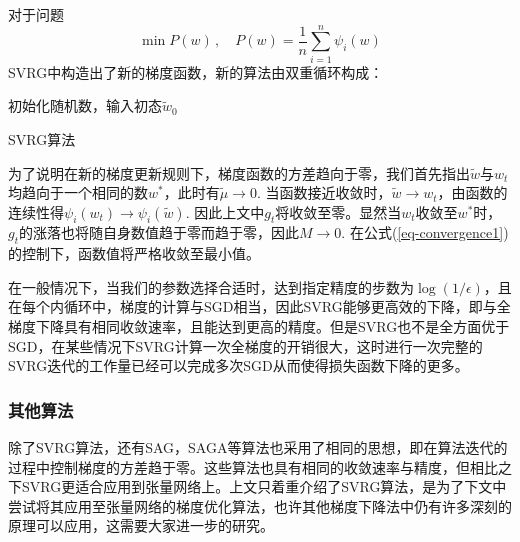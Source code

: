 对于问题
\begin{equation}\label{key}
\min P(w)\,,\quad P(w)=\frac1n \sum_{i=1}^n \psi_i(w)
\end{equation}
SVRG中构造出了新的梯度函数，新的算法由双重循环构成：

\begin{algorithm}[htb]
	
	
	初始化随机数，输入初态$\tilde{w}_0$\;
	\caption{SVRG算法}
	\label{algo:algorithm1}
\end{algorithm}

为了说明在新的梯度更新规则下，梯度函数的方差趋向于零，我们首先指出$\tilde{w}$与$w_t$均趋向于一个相同的数$w^*$，此时有$\tilde{\mu}\to 0$. 当函数接近收敛时，$\tilde{w}\to w_t$，由函数的连续性得$\psi_i(w_t)\to\psi_i(\tilde{w})$. 因此上文中$g_t$将收敛至零。显然当$w_t$收敛至$w^*$时，$g_t$的涨落也将随自身数值趋于零而趋于零，因此$M\to 0$. 在公式(\ref{eq-convergence1})的控制下，函数值将严格收敛至最小值。

在一般情况下，当我们的参数选择合适时，达到指定精度的步数为$\log(1/\epsilon)$，且在每个内循环中，梯度的计算与SGD相当，因此SVRG能够更高效的下降，即与全梯度下降具有相同收敛速率，且能达到更高的精度。但是SVRG也不是全方面优于SGD，在某些情况下SVRG计算一次全梯度的开销很大，这时进行一次完整的SVRG迭代的工作量已经可以完成多次SGD从而使得损失函数下降的更多。

\subsubsection{其他算法}

除了SVRG算法，还有SAG\cite{rouxStochasticGradientMethod}，SAGA\cite{hofmannVarianceReducedStochastic2016,defazioSAGAFastIncremental2014}等算法也采用了相同的思想，即在算法迭代的过程中控制梯度的方差趋于零。这些算法也具有相同的收敛速率与精度，但相比之下SVRG更适合应用到张量网络上。上文只着重介绍了SVRG算法，是为了下文中尝试将其应用至张量网络的梯度优化算法，也许其他梯度下降法中仍有许多深刻的原理可以应用，这需要大家进一步的研究。

